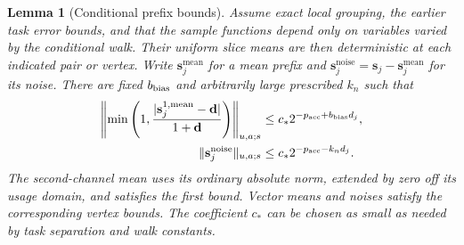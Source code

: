 \documentclass[11pt]{article}
\numberwithin{equation}{section}
\newtheorem{lemma}[theorem]{Lemma}
\theoremstyle{definition}
\theoremstyle{remark}
\begin{document}
\begin{lemma}[Conditional prefix bounds]\label{lem:est-prefix}
Assume exact local grouping, the earlier task error bounds, and that the
sample functions depend only on variables varied by the conditional walk.
Their uniform slice means are then deterministic at each indicated pair
or vertex.  Write ${\mathbf{s}}_j^{\mathrm{mean}}$ for a mean prefix and
${\mathbf{s}}_j^{\mathrm{noise}}={\mathbf{s}}_j-{\mathbf{s}}_j^{\mathrm{mean}}$ for its noise.  There are fixed
${b_{\rm bias}}$ and arbitrarily large prescribed ${k}_n$ such that
\begin{align}
 \left\|\min\left(1,
       \frac{|{\mathbf{s}}_j^{1,\mathrm{mean}}-{\mathbf d}|}{1+{\mathbf d}}\right)\right\|_{u,a;s}
       &\le c_*2^{-{p_{\rm acc}}+{b_{\rm bias}}d_j},
       \label{eq:est-prefix-mean}\\
 \|{\mathbf{s}}_j^{\mathrm{noise}}\|_{u,a;s}
       &\le c_*2^{-{p_{\rm acc}}-{k}_nd_j}.
       \label{eq:est-prefix-noise}
\end{align}
The second-channel mean uses its ordinary absolute norm, extended by zero
off its usage domain, and satisfies the first bound.  Vector means and
noises satisfy the corresponding vertex bounds.  The coefficient $c_*$
can be chosen as small as needed by task separation and walk constants.
\end{lemma}
\end{document}
